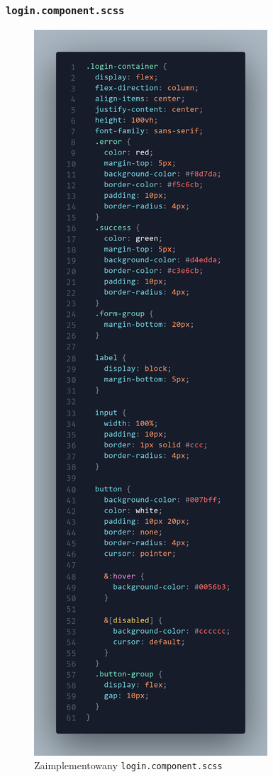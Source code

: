 \documentclass[12pt]{article}
\begin{document}
\subsubsection{\texttt{login.component.scss}}
\begin{figure}[H]
  \clearpage
  \centering
  \includegraphics[height=\textheight]{image-6.png}
  \caption{Zaimplementowany \texttt{login.component.scss}}
  \label{fig:image-6}
\end{figure}
\end{document}

